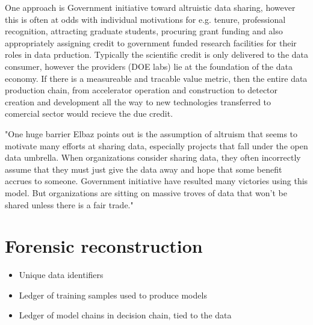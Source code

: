 \documentclass{article}
\begin{document}
One approach is Government initiative toward altruistic data sharing, however this is often at odds with individual motivations for e.g. tenure, professional recognition, attracting graduate students, procuring grant funding and also appropriately assigning credit to government funded research facilities for their roles in data prduction.  Typically the scientific credit is only delivered to the data consumer, however the providers (DOE labs) lie at the foundation of the data economy.
If there is a measureable and tracable value metric, then the entire data production chain, from accelerator operation and construction to detector creation and development all the way to new technologies transferred to comercial sector would recieve the due credit.

"One huge barrier Elbaz points out is the assumption of altruism that seems to motivate many
efforts at sharing data, especially projects that fall under the open data umbrella. When
organizations consider sharing data, they often incorrectly assume that they must just give the
data away and hope that some benefit accrues to someone. Government initiative have resulted
many victories using this model. But organizations are sitting on massive troves of data that
won’t be shared unless there is a fair trade."


\section{Forensic reconstruction}
\begin{itemize}
\item Unique data identifiers
\item Ledger of training samples used to produce models
\item Ledger of model chains in decision chain, tied to the data
\end{itemize}

\section{}


\end{document}
